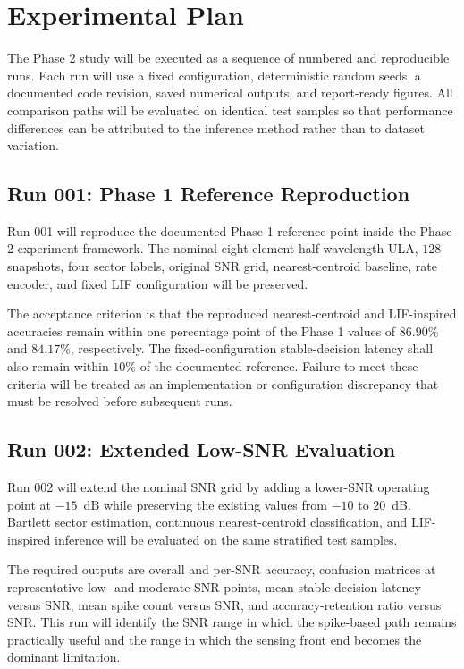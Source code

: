 \section{Experimental Plan}

The Phase 2 study will be executed as a sequence of numbered and reproducible runs. Each run will use a fixed configuration, deterministic random seeds, a documented code revision, saved numerical outputs, and report-ready figures. All comparison paths will be evaluated on identical test samples so that performance differences can be attributed to the inference method rather than to dataset variation.

\subsection{Run 001: Phase 1 Reference Reproduction}

Run 001 will reproduce the documented Phase 1 reference point inside the Phase 2 experiment framework. The nominal eight-element half-wavelength ULA, $128$ snapshots, four sector labels, original SNR grid, nearest-centroid baseline, rate encoder, and fixed LIF configuration will be preserved.

The acceptance criterion is that the reproduced nearest-centroid and LIF-inspired accuracies remain within one percentage point of the Phase 1 values of $86.90\%$ and $84.17\%$, respectively. The fixed-configuration stable-decision latency shall also remain within $10\%$ of the documented reference. Failure to meet these criteria will be treated as an implementation or configuration discrepancy that must be resolved before subsequent runs.

\subsection{Run 002: Extended Low-SNR Evaluation}

Run 002 will extend the nominal SNR grid by adding a lower-SNR operating point at $-15$~dB while preserving the existing values from $-10$ to $20$~dB. Bartlett sector estimation, continuous nearest-centroid classification, and LIF-inspired inference will be evaluated on the same stratified test samples.

The required outputs are overall and per-SNR accuracy, confusion matrices at representative low- and moderate-SNR points, mean stable-decision latency versus SNR, mean spike count versus SNR, and accuracy-retention ratio versus SNR. This run will identify the SNR range in which the spike-based path remains practically useful and the range in which the sensing front end becomes the dominant limitation.

